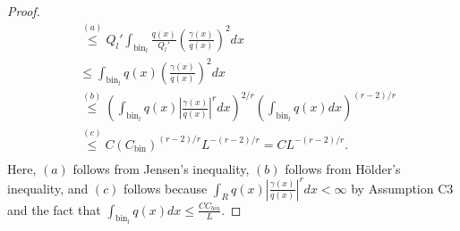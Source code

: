 \documentclass{article}
\newcommand{\bin}{\text{bin}}
\begin{document}
\begin{proof}
\begin{align*}
   &\stackrel{(a)} \leq Q_l' \int_{\bin_l} \frac{q(x)}{Q_l'} \left( \frac{\gamma(x)}{q(x)} \right)^2 dx\\
   &\leq \int_{\bin_l} q(x) \left( \frac{\gamma(x)}{q(x)} \right)^2 dx \\
   &\stackrel{(b)}\leq \left(\int_{\bin_l} q(x) \left| \frac{\gamma(x)}{q(x)} \right|^r dx \right)^{2/r}
         \left(\int_{\bin_l} q(x) dx \right)^{(r-2)/r} \\
   &\stackrel{(c)} \leq C (C_\bin)^{(r-2)/r} L^{-(r-2)/r} = C L^{-(r-2)/r}.\\
\end{align*}
Here, $(a)$ follows from Jensen's inequality, $(b)$ follows from H\"{o}lder's inequality, and $(c)$ follows because $\int_R q(x) \left| \frac{\gamma(x)}{q(x)} \right|^r dx < \infty$ by Assumption C3 and the fact that $\int_{\bin_l} q(x) dx \leq \frac{C C_{bin}}{L}$.  


\end{proof}
\end{document}
